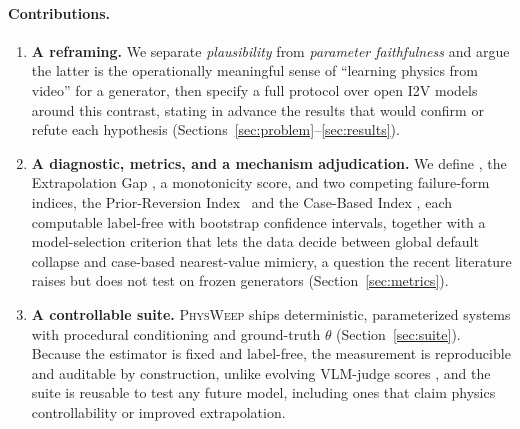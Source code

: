 \documentclass[10pt,twocolumn,letterpaper]{article}
\begin{document}
\paragraph{Contributions.}
\begin{enumerate}[leftmargin=1.4em,itemsep=2pt,topsep=2pt]
  \item \textbf{A reframing.} We separate \emph{plausibility} from
  \emph{parameter faithfulness} and argue the latter is the operationally
  meaningful sense of ``learning physics from video'' for a generator, then
  specify a full protocol over open I2V models around this contrast, stating
  in advance the results that would confirm or refute each hypothesis
  (Sections~\ref{sec:problem}--\ref{sec:results}).
  \item \textbf{A diagnostic, metrics, and a mechanism adjudication.} We define
  \PRE, the Extrapolation Gap \EG, a monotonicity score, and two competing
  failure-form indices, the Prior-Reversion Index \PRI\ and the Case-Based
  Index \CBI, each computable label-free with bootstrap confidence intervals,
  together with a model-selection criterion that lets the data decide between
  global default collapse and case-based nearest-value mimicry, a question the
  recent literature raises but does not test on frozen generators
  (Section~\ref{sec:metrics}).
  \item \textbf{A controllable suite.}
  \textsc{PhysWeep} ships deterministic, parameterized systems with procedural
  conditioning and ground-truth $\theta$ (Section~\ref{sec:suite}). Because the
  estimator is fixed and label-free, the measurement is reproducible and
  auditable by construction, unlike evolving VLM-judge scores
  \citep{phyground2026}, and the suite is reusable to test any future model,
  including ones that claim physics controllability or improved extrapolation.
\end{enumerate}
\end{document}
